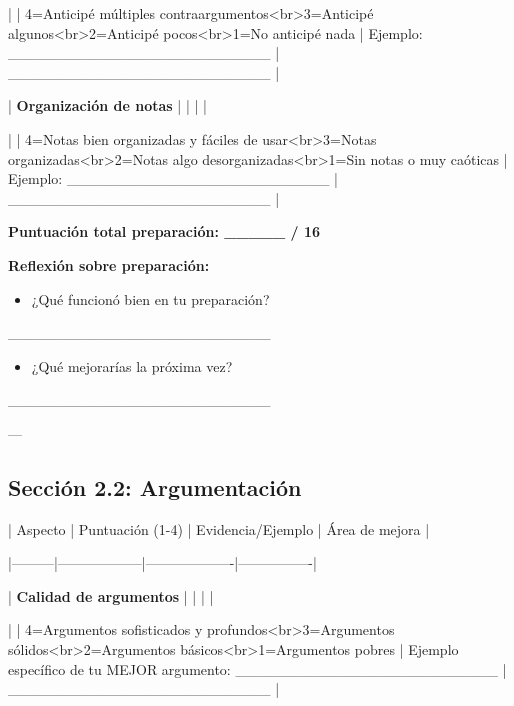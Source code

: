 \documentclass[a4paper,11pt]{article}
\begin{document}
| | 4=Anticipé múltiples contraargumentos<br>3=Anticipé algunos<br>2=Anticipé pocos<br>1=No anticipé nada | Ejemplo: _________________________ | _________________________ |

| \textbf{Organización de notas} | | | |

| | 4=Notas bien organizadas y fáciles de usar<br>3=Notas organizadas<br>2=Notas algo desorganizadas<br>1=Sin notas o muy caóticas | Ejemplo: _________________________ | _________________________ |

\vspace{0.2cm}

\textbf{Puntuación total preparación: _____ / 16}

\vspace{0.2cm}

\textbf{Reflexión sobre preparación:}

\begin{itemize}

  \item ¿Qué funcionó bien en tu preparación?

\end{itemize}

_________________________

\begin{itemize}

  \item ¿Qué mejorarías la próxima vez?

\end{itemize}

_________________________

\vspace{0.2cm}

---

\vspace{0.2cm}

\subsection{Sección 2.2: Argumentación}

\vspace{0.2cm}

| Aspecto | Puntuación (1-4) | Evidencia/Ejemplo | Área de mejora |

|---------|------------------|-------------------|----------------|

| \textbf{Calidad de argumentos} | | | |

| | 4=Argumentos sofisticados y profundos<br>3=Argumentos sólidos<br>2=Argumentos básicos<br>1=Argumentos pobres | Ejemplo específico de tu MEJOR argumento: _________________________ | _________________________ |
\end{document}
